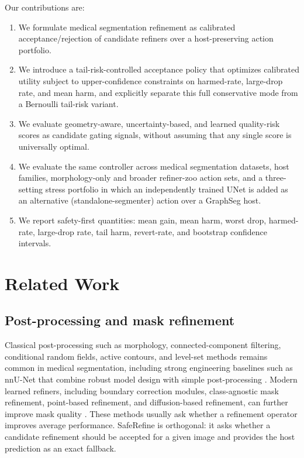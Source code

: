 \documentclass[preprint,12pt]{elsarticle}
\begin{document}
Our contributions are:
\begin{enumerate}
    \item We formulate medical segmentation refinement as calibrated
    acceptance/rejection of candidate refiners over a host-preserving action
    portfolio.
    \item We introduce a tail-risk-controlled acceptance policy that optimizes
    calibrated utility subject to upper-confidence constraints on harmed-rate,
    large-drop rate, and mean harm, and explicitly separate this full
    conservative mode from a Bernoulli tail-risk variant.
    \item We evaluate geometry-aware, uncertainty-based, and learned
    quality-risk scores as candidate gating signals, without assuming that any
    single score is universally optimal.
    \item We evaluate the same controller across medical segmentation
    datasets, host families, morphology-only and broader refiner-zoo action
    sets, and a three-setting stress portfolio in which an independently trained
    UNet is added as an alternative (standalone-segmenter) action over a
    GraphSeg host.
    \item We report safety-first quantities: mean gain, mean harm, worst drop,
    harmed-rate, large-drop rate, tail harm, revert-rate, and bootstrap
    confidence intervals.
\end{enumerate}

\section{Related Work}

\subsection{Post-processing and mask refinement}

Classical post-processing such as morphology, connected-component filtering,
conditional random fields, active contours, and level-set methods remains
common in medical segmentation, including strong engineering baselines such as
nnU-Net that combine robust model design with simple post-processing
\cite{isensee2021nnunet}. Modern learned refiners, including boundary
correction modules, class-agnostic mask refinement, point-based refinement, and
diffusion-based refinement, can further improve mask quality
\cite{zheng2015crfrnn,yuan2020segfix,cheng2020cascadepsp,kirillov2020pointrend,segrefiner2023}.
These methods usually ask whether a refinement operator improves average
performance. SafeRefine is orthogonal: it asks whether a candidate refinement
should be accepted for a given image and provides the host prediction as an
exact fallback.
\end{document}
